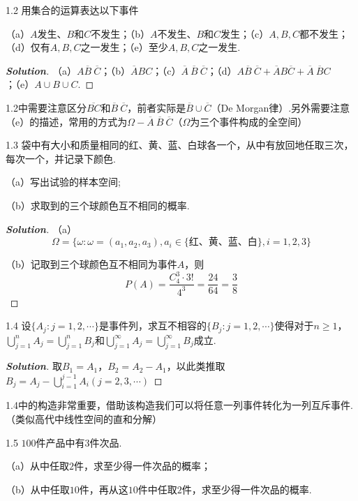 \documentclass[10pt, a4paper, oneside]{ctexart}
\newenvironment{solution}{\begin{proof}[\bf Solution]}{\end{proof}}
\begin{document}
1.2 用集合的运算表达以下事件

（a）$A$发生、$B$和$C$不发生；（b）$A$不发生、$B$和$C$发生；（c）$A,B,C$都不发生；（d）仅有$A,B,C$之一发生；（e）至少$A,B,C$之一发生.
\begin{solution}
（a）$A\overline{B}\:{\overline{C}}$；（b）$\overline{A}BC$；（c）$\overline{A}\:\overline{B}\:\overline{C}$；（d）$A\overline{B}\:\overline{C}+\overline{A}B\overline{C}+\overline{A}\:\overline{B}C$；（e）$A\cup B\cup C$.
\end{solution}
\begin{remark}
1.2中需要注意区分$\overline{BC}$和$\overline{B}\:\overline{C}$，前者实际是$\overline{B}\cup \overline{C}$（De Morgan律）.另外需要注意（e）的描述，常用的方式为$\Omega-\overline{A}\:\overline{B}\:\overline{C}$（$\Omega$为三个事件构成的全空间）
\end{remark}

1.3 袋中有大小和质量相同的红、黄、蓝、白球各一个，从中有放回地任取三次，每次一个，并记录下颜色.

（a）写出试验的样本空间;

（b）求取到的三个球颜色互不相同的概率.
\begin{solution}
（a）
\[\Omega  = \{ \omega :\omega  = ({a_1},{a_2},{a_3}),{a_i} \in \{\text{红、黄、蓝、白} \} ,i = 1,2,3\} \]

（b）记取到三个球颜色互不相同为事件$A$，则
\[P(A) = \frac{{C_4^3}\cdot 3!}{{{4^3}}} = \frac{{24}}{{64}} = \frac{3}{8}\]
\end{solution}

1.4 设$\{A_j:j=1,2,\cdots\}$是事件列，求互不相容的$\{B_j:j=1,2,\cdots\}$使得对于$n\geqslant 1$，$\bigcup\limits_{j = 1}^n {{A_j}}  = \bigcup\limits_{j = 1}^n {{B_j}} $和$\bigcup\limits_{j = 1}^\infty  {{A_j}}  = \bigcup\limits_{j = 1}^\infty  {{B_j}} $成立.
\begin{solution}
取$B_1=A_1$，$B_2=A_2-A_1$，以此类推取$B_j=A_j-\bigcup\limits_{i = 1}^{j-1} {{A_i}}(j=2,3,\cdots)$
\end{solution}
\begin{remark}
1.4中的构造非常重要，借助该构造我们可以将任意一列事件转化为一列互斥事件.（类似高代中线性空间的直和分解）
\end{remark}


1.5 $100$件产品中有$3$件次品.

（a）从中任取$2$件，求至少得一件次品的概率；

（b）从中任取$10$件，再从这$10$件中任取$2$件，求至少得一件次品的概率.
\end{document}
